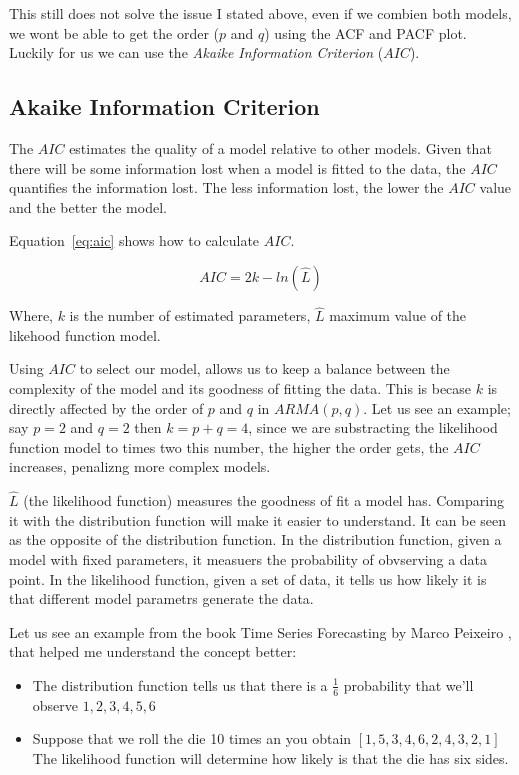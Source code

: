 \documentclass[journal]{IEEEtran}
\begin{document}
This still does not solve the issue I stated above, even if we combien both
models, we wont be able to get the order ($p$ and $q$) using the ACF and PACF
plot. Luckily for us we can use the \emph{Akaike Information Criterion}
($AIC$).

\subsection{Akaike Information Criterion}\label{sub:aic}

The $AIC$ estimates the quality of a model relative to other models.  Given
that there will be some information lost when a model is fitted to the data,
the $AIC$ quantifies the information lost. The less information lost, the
lower the $AIC$ value and the better the model.

Equation~\ref{eq:aic} shows how to calculate $AIC$.

\begin{equation}
    AIC = 2k - ln(\hat{L})
    \label{eq:aic}
\end{equation}

Where, $k$ is the number of estimated parameters, $\hat{L}$ maximum value of
the likehood function model.

Using $AIC$ to select our model, allows us to keep a balance between the
complexity of the model and its goodness of fitting the data. This is becase
$k$ is directly affected by the order of $p$ and $q$ in $ARMA(p,q)$. Let us
see an example; say $p = 2$ and $q=2$ then $k = p + q = 4$, since we are
substracting the likelihood function model to times two this number, the
higher the order gets, the $AIC$ increases, penalizng more complex models.

$\hat{L}$ (the likelihood function) measures the goodness of fit a model has.
Comparing it with the distribution function will make it easier to understand.
It can be seen as the opposite of the distribution function. In the
distribution function, given a model with fixed parameters, it measuers the
probability of obvserving a data point. In the likelihood function, given a
set of data, it tells us  how likely it is that different model parametrs
generate the data.

Let us see an example from the book Time Series Forecasting by Marco Peixeiro
\cite{timeseries}, that helped me understand the concept better:

\begin{itemize}
    \item
        The distribution function tells us that there is a $\frac{1}{6}$
        probability that we'll observe ${1,2,3,4,5,6}$
    \item
        Suppose that we roll the die 10 times an you obtain
        $[1,5,3,4,6,2,4,3,2,1]$ The likelihood function will determine how
        likely is that the die has six sides.
\end{itemize}
\end{document}
